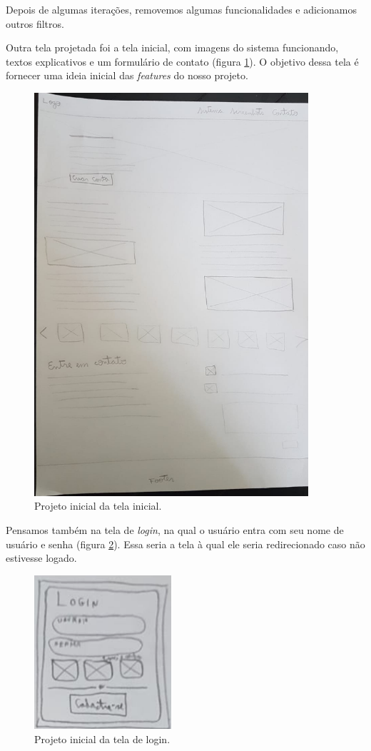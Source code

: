 \documentclass[]{politex}
\begin{document}
Depois de algumas iterações, removemos algumas funcionalidades e adicionamos
outros filtros.

Outra tela projetada foi a tela inicial, com imagens do sistema
funcionando, textos explicativos e um formulário de contato (figura \ref{fig:rascunho_landing}).
O objetivo dessa tela é fornecer uma ideia inicial das \textit{features} do
nosso projeto.

\begin{figure}[H]
    \centering
    \includegraphics[width=4in]{imagens/rascunho-landing}
    \caption{Projeto inicial da tela inicial.}
    \label{fig:rascunho_landing}
\end{figure}

Pensamos também na tela de \textit{login}, na qual o usuário entra com seu nome
de usuário e senha (figura \ref{fig:rascunho_login}). Essa seria a tela à qual
ele seria redirecionado caso não estivesse logado.

\begin{figure}[H]
    \centering
    \includegraphics[width=2in]{imagens/rascunho-login}
    \caption{Projeto inicial da tela de login.}
    \label{fig:rascunho_login}
\end{figure}
\end{document}
